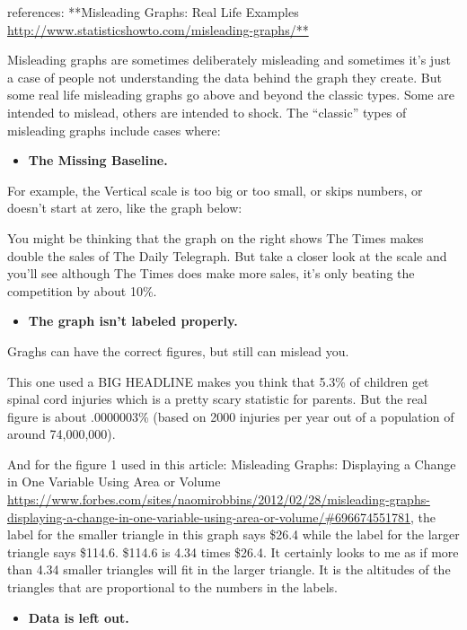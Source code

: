 \documentclass[]{book}
\providecommand{\tightlist}{%
  \setlength{\itemsep}{0pt}\setlength{\parskip}{0pt}}
\theoremstyle{definition}
\theoremstyle{definition}
\theoremstyle{definition}
\theoremstyle{remark}
\begin{document}
references: **Misleading Graphs: Real Life Examples
\url{http://www.statisticshowto.com/misleading-graphs/**}

Misleading graphs are sometimes deliberately misleading and sometimes
it's just a case of people not understanding the data behind the graph
they create. But some real life misleading graphs go above and beyond
the classic types. Some are intended to mislead, others are intended to
shock. The ``classic'' types of misleading graphs include cases where:

\begin{itemize}
\tightlist
\item
  \textbf{The Missing Baseline.}
\end{itemize}

For example, the Vertical scale is too big or too small, or skips
numbers, or doesn't start at zero, like the graph below:

You might be thinking that the graph on the right shows The Times makes
double the sales of The Daily Telegraph. But take a closer look at the
scale and you'll see although The Times does make more sales, it's only
beating the competition by about 10\%.

\begin{itemize}
\tightlist
\item
  \textbf{The graph isn't labeled properly.}
\end{itemize}

Graghs can have the correct figures, but still can mislead you.

This one used a BIG HEADLINE makes you think that 5.3\% of children get
spinal cord injuries which is a pretty scary statistic for parents. But
the real figure is about .0000003\% (based on 2000 injuries per year out
of a population of around 74,000,000).

And for the figure 1 used in this article: Misleading Graphs: Displaying
a Change in One Variable Using Area or Volume
\url{https://www.forbes.com/sites/naomirobbins/2012/02/28/misleading-graphs-displaying-a-change-in-one-variable-using-area-or-volume/\#696674551781},
the label for the smaller triangle in this graph says \$26.4 while the
label for the larger triangle says \$114.6. \$114.6 is 4.34 times
\$26.4. It certainly looks to me as if more than 4.34 smaller triangles
will fit in the larger triangle. It is the altitudes of the triangles
that are proportional to the numbers in the labels.

\begin{itemize}
\tightlist
\item
  \textbf{Data is left out.}
\end{itemize}
\end{document}
